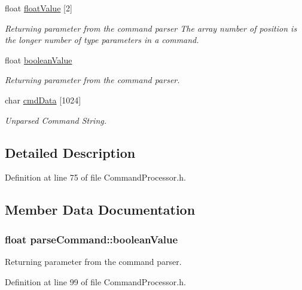\begin{DoxyCompactItemize}
float \hyperlink{structparse_command_a475f06e9e3728cc583008ad66dc48329}{float\-Value} \mbox{[}2\mbox{]}
\begin{DoxyCompactList}\small\item\em Returning parameter from the command parser The array number of position is the longer number of type parameters in a command. \end{DoxyCompactList}\item 
float \hyperlink{structparse_command_aff75594be6413210138456dc4572be52}{boolean\-Value}
\begin{DoxyCompactList}\small\item\em Returning parameter from the command parser. \end{DoxyCompactList}\item 
char \hyperlink{structparse_command_a01d90da128793f2c09ce31ce4a9f2ce5}{cmd\-Data} \mbox{[}1024\mbox{]}
\begin{DoxyCompactList}\small\item\em Unparsed Command String. \end{DoxyCompactList}\end{DoxyCompactItemize}


\subsection{Detailed Description}


Definition at line 75 of file Command\-Processor.\-h.



\subsection{Member Data Documentation}
\hypertarget{structparse_command_aff75594be6413210138456dc4572be52}{
\subsubsection[{boolean\-Value}]{\setlength{\rightskip}{0pt plus 5cm}float parse\-Command\-::boolean\-Value}}\label{structparse_command_aff75594be6413210138456dc4572be52}


Returning parameter from the command parser. 



Definition at line 99 of file Command\-Processor.\-h.

